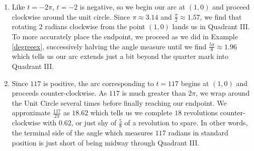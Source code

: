 \documentclass[12pt]{ximera}
\begin{document}
\begin{example}
\begin{enumerate}
\begin{tabular}{cc}
  

\\

\end{tabular}

\item Like $t=-2\pi$, $t=-2$ is negative, so we begin our arc at $(1,0)$ and proceed clockwise around the unit circle.  Since $\pi \approx 3.14$ and  $\frac{\pi}{2} \approx 1.57$, we find that rotating $2$ radians clockwise from the point $(1,0)$ lands us in Quadrant III.  To more accurately place the endpoint, we proceed as we did in Example \ref{degreeex}, successively halving the angle measure until we find $\frac{5 \pi}{8} \approx 1.96$ which tells us our arc extends just a bit beyond the quarter mark into Quadrant III.

\item  Since $117$ is positive, the arc corresponding to $t=117$ begins at $(1,0)$ and proceeds counter-clockwise.  As $117$ is much greater than $2\pi$, we wrap around the Unit Circle several times before finally reaching our endpoint.  We approximate $\frac{117}{2\pi}$ as $18.62$ which tells us we complete $18$ revolutions counter-clockwise with $0.62$, or  just shy of $\frac{5}{8}$ of a revolution to spare.  In other words, the terminal side of the angle which measures $117$ radians in standard position is just short of being midway through Quadrant III.

\smallskip

\hspace{.5in} \begin{tabular}{cc}

  


\end{tabular}
\end{enumerate}
\end{example}
\end{document}
